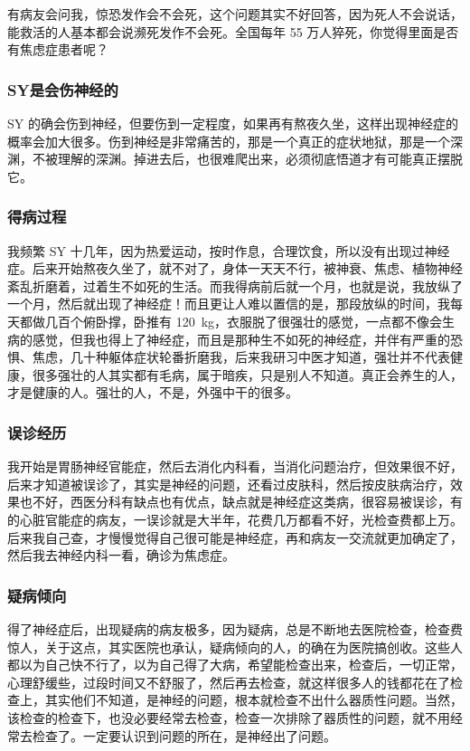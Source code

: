\documentclass[fontset=founder]{ctexart}
\begin{document}
有病友会问我，惊恐发作会不会死，这个问题其实不好回答，因为死人不会说话，能救活的人基本都会说濒死发作不会死。全国每年 55 万人猝死，你觉得里面是否有焦虑症患者呢？

\subsubsection{SY是会伤神经的}

SY 的确会伤到神经，但要伤到一定程度，如果再有熬夜久坐，这样出现神经症的概率会加大很多。伤到神经是非常痛苦的，那是一个真正的症状地狱，那是一个深渊，不被理解的深渊。掉进去后，也很难爬出来，必须彻底悟道才有可能真正摆脱它。

\subsubsection{得病过程}

我频繁 SY 十几年，因为热爱运动，按时作息，合理饮食，所以没有出现过神经症。后来开始熬夜久坐了，就不对了，身体一天天不行，被神衰、焦虑、植物神经紊乱折磨着，过着生不如死的生活。而我得病前后就一个月，也就是说，我放纵了一个月，然后就出现了神经症！而且更让人难以置信的是，那段放纵的时间，我每天都做几百个俯卧撑，卧推有 \SI{120}{\kilo\gram}，衣服脱了很强壮的感觉，一点都不像会生病的感觉，但我也得上了神经症，而且是那种生不如死的神经症，并伴有严重的恐惧、焦虑，几十种躯体症状轮番折磨我，后来我研习中医才知道，强壮并不代表健康，很多强壮的人其实都有毛病，属于暗疾，只是别人不知道。真正会养生的人，才是健康的人。强壮的人，不是，外强中干的很多。

\subsubsection{误诊经历}

我开始是胃肠神经官能症，然后去消化内科看，当消化问题治疗，但效果很不好，后来才知道被误诊了，其实是神经的问题，还看过皮肤科，然后按皮肤病治疗，效果也不好，西医分科有缺点也有优点，缺点就是神经症这类病，很容易被误诊，有的心脏官能症的病友，一误诊就是大半年，花费几万都看不好，光检查费都上万。后来我自己查，才慢慢觉得自己很可能是神经症，再和病友一交流就更加确定了，然后我去神经内科一看，确诊为焦虑症。

\subsubsection{疑病倾向}

得了神经症后，出现疑病的病友极多，因为疑病，总是不断地去医院检查，检查费惊人，关于这点，其实医院也承认，疑病倾向的人，的确在为医院搞创收。这些人都以为自己快不行了，以为自己得了大病，希望能检查出来，检查后，一切正常，心理舒缓些，过段时间又不舒服了，然后再去检查，就这样很多人的钱都花在了检查上，其实他们不知道，是神经的问题，根本就检查不出什么器质性问题。当然，该检查的检查下，也没必要经常去检查，检查一次排除了器质性的问题，就不用经常去检查了。一定要认识到问题的所在，是神经出了问题。
\end{document}
